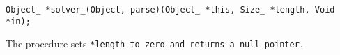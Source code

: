 
\tt{Object_ *solver_(Object, parse)(Object_ *this, Size_ *length, Void *in);}


The procedure sets \tt{*length} to zero and returns a null pointer.
